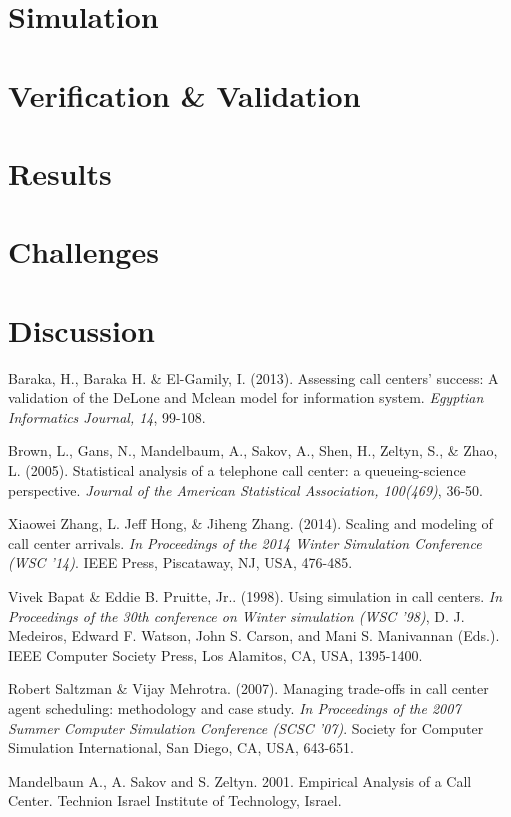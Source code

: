 \documentclass[12pt,twocolumn]{article}
\begin{document}
\section{Simulation}



\section{Verification \& Validation}



\section{Results}



\section{Challenges}



\section{Discussion}



\begin{thebibliography}{7}
Baraka, H., Baraka H. \& El-Gamily, I. (2013). Assessing call centers' success: A validation of the DeLone and Mclean model for information system. \textit{Egyptian Informatics Journal, 14}, 99-108.

Brown, L., Gans, N., Mandelbaum, A., Sakov, A., Shen, H., Zeltyn, S., \& Zhao, L. (2005). Statistical analysis of a telephone call center: a queueing-science perspective. \textit{Journal of the American Statistical Association, 100(469)}, 36-50.

Xiaowei Zhang, L. Jeff Hong, \& Jiheng Zhang. (2014). Scaling and modeling of call center arrivals. \textit{In Proceedings of the 2014 Winter Simulation Conference (WSC '14)}. IEEE Press, Piscataway, NJ, USA, 476-485.

Vivek Bapat \& Eddie B. Pruitte, Jr.. (1998). Using simulation in call centers. \textit{In Proceedings of the 30th conference on Winter simulation (WSC '98)}, D. J. Medeiros, Edward F. Watson, John S. Carson, and Mani S. Manivannan (Eds.). IEEE Computer Society Press, Los Alamitos, CA, USA, 1395-1400.

Robert Saltzman \& Vijay Mehrotra. (2007). Managing trade-offs in call center agent scheduling: methodology and case study. \textit{In Proceedings of the 2007 Summer Computer Simulation Conference (SCSC '07)}. Society for Computer Simulation International, San Diego, CA, USA, 643-651.

Mandelbaun A., A. Sakov and S. Zeltyn. 2001. Empirical Analysis of a Call Center. Technion Israel Institute of Technology, Israel.

\end{thebibliography}
\end{document}
